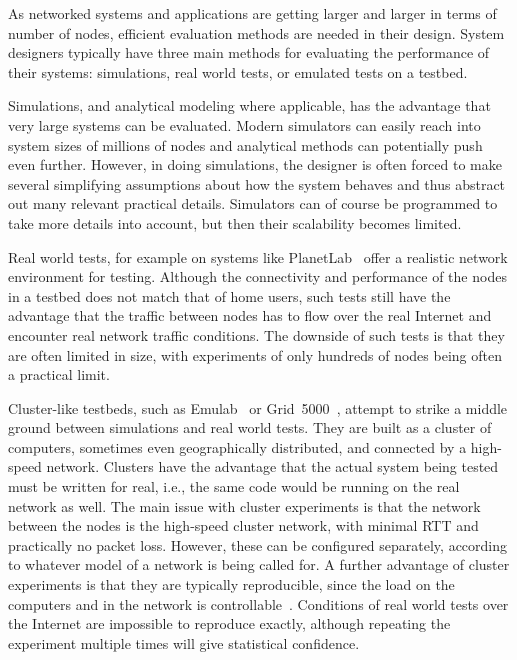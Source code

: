 \documentclass[10pt,letterpaper,twocolumn]{article}
\begin{document}
As networked systems and applications are getting larger and larger in
terms of number of nodes, efficient evaluation methods are needed in
their design. System designers typically have three main methods for
evaluating the performance of their systems: simulations, real world
tests, or emulated tests on a testbed.

Simulations, and analytical modeling where applicable, has the
advantage that very large systems can be evaluated. Modern simulators
can easily reach into system sizes of millions of nodes and analytical
methods can potentially push even further. However, in doing
simulations, the designer is often forced to make several simplifying
assumptions about how the system behaves and thus abstract out many
relevant practical details. Simulators can of course be programmed to
take more details into account, but then their scalability becomes
limited.

Real world tests, for example on systems like
PlanetLab~\cite{planetlab,PlanetLabWeb} offer a realistic network
environment for testing. Although the connectivity and performance of
the nodes in a testbed does not match that of home users, such tests
still have the advantage that the traffic between nodes has to flow
over the real Internet and encounter real network traffic
conditions. The downside of such tests is that they are often limited
in size, with experiments of only hundreds of nodes being
often a practical limit.

Cluster-like testbeds, such as Emulab~\cite{Emulab} or
Grid~5000~\cite{Grid5000}, attempt to strike a middle ground between
simulations and real world tests. They are built as a cluster of
computers, sometimes even geographically distributed, and connected by
a high-speed network. Clusters have the advantage that the actual
system being tested must be written for real, i.e., the same code
would be running on the real network as well. The main issue with
cluster experiments is that the network between the nodes is the
high-speed cluster network, with minimal RTT and practically no packet
loss. However, these can be configured separately, according to
whatever model of a network is being called for. A further advantage
of cluster experiments is that they are typically reproducible, since
the load on the computers and in the network is
controllable~\cite{rao10,antoniu04}. Conditions of real world tests
over the Internet are impossible to reproduce exactly, although
repeating the experiment multiple times will give statistical
confidence. 
\end{document}
